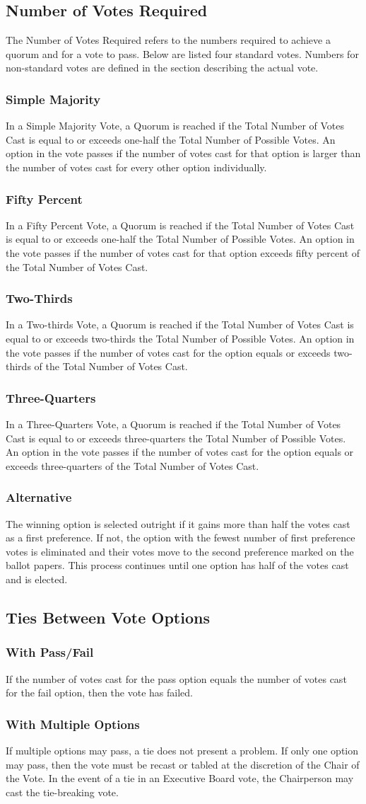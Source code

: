 \documentclass{article}
\newcommand{\asection}[1]{\subsection{#1} \label{#1}}
\newcommand{\asubsection}[1]{\subsubsection{#1} \label{#1}}
\begin{document}
\asection{Number of Votes Required}
The Number of Votes Required refers to the numbers required to achieve a quorum and for a vote to pass.
Below are listed four standard votes.
Numbers for non-standard votes are defined in the section describing the actual vote.
\asubsection{Simple Majority}
In a Simple Majority Vote, a Quorum is reached if the Total Number of Votes Cast is equal to or exceeds one-half the Total Number of Possible Votes.
An option in the vote passes if the number of votes cast for that option is larger than the number of votes cast for every other option individually.
\asubsection{Fifty Percent}
In a Fifty Percent Vote, a Quorum is reached if the Total Number of Votes Cast is equal to or exceeds one-half the Total Number of Possible Votes.
An option in the vote passes if the number of votes cast for that option exceeds fifty percent of the Total Number of Votes Cast.
\asubsection{Two-Thirds}
In a Two-thirds Vote, a Quorum is reached if the Total Number of Votes Cast is equal to or exceeds two-thirds the Total Number of Possible Votes.
An option in the vote passes if the number of votes cast for the option equals or exceeds two-thirds of the Total Number of Votes Cast.
\asubsection{Three-Quarters}
In a Three-Quarters Vote, a Quorum is reached if the Total Number of Votes Cast is equal to or exceeds three-quarters the Total Number of Possible Votes.
An option in the vote passes if the number of votes cast for the option equals or exceeds three-quarters of the Total Number of Votes Cast.
\asubsection{Alternative}
The winning option is selected outright if it gains more than half the votes cast as a first preference.
If not, the option with the fewest number of first preference votes is eliminated and their votes move to the second preference marked on the ballot papers.
This process continues until one option has half of the votes cast and is elected.

\asection{Ties Between Vote Options}
\asubsection{With Pass/Fail}
If the number of votes cast for the pass option equals the number of votes cast for the fail option, then the vote has failed.
\asubsection{With Multiple Options}
If multiple options may pass, a tie does not present a problem.
If only one option may pass, then the vote must be recast or tabled at the discretion of the Chair of the Vote.
In the event of a tie in an Executive Board vote, the Chairperson may cast the tie-breaking vote.
\end{document}
